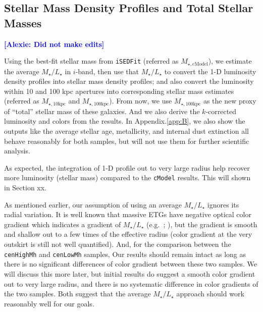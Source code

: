 \documentclass{emulateapj}
\def\cmodel{\texttt{cModel}}
\def\rbcg{\texttt{cenHighMh}}
\def\nbcg{\texttt{cenLowMh}}
\def\minn{{$M_{\star,10\mathrm{kpc}}$}}
\def\mtot{{$M_{\star,100\mathrm{kpc}}$}}
\def\mcmodel{{$M_{\star,\mathrm{cModel}}$}}
\def\m2l{{$M_{\star}/L_{\star}$}}
\newcommand{\alexie}[1]{\textcolor{blue}{\textbf{[Alexie: #1]}}}
\begin{document}
\begin{CJK*}{UTF8}{gbsn}
\subsection{Stellar Mass Density Profiles and Total Stellar Masses}
    \label{ssec:mtotal}
    
    \alexie{Did not make edits}
    
    Using the best-fit stellar mass from \texttt{iSEDFit} (referred as \mcmodel{}), 
    we estimate the average \m2l{} in $i$-band, then use that \m2l{} to convert the 
    1-D luminosity density profiles into stellar mass density profiles; and 
    also convert the luminosity within 10 and 100 kpc apertures into 
    corresponding stellar mass estimates (referred as \minn{} and \mtot{}). 
    From now, we use \mtot{} as the new proxy of ``total'' stellar mass of these 
    galaxies.  
    And we also derive the $k$-corrected luminosity and colors from the results.
    In Appendix.\ref{app:B}, we also show the outputs like the average stellar age, 
    metallicity, and internal dust extinction all behave reasonably for both 
    samples, but will not use them for further scientific analysis. 
    
    As expected, the integration of 1-D profile out to very large radius help 
    recover more luminosity (stellar mass) compared to the \cmodel{} results. This will shown in Section xx.
 
        
    As mentioned earlier, our assumption of using an average \m2l{} ignores its
    radial variation.   
    It is well known that massive ETGs have negative optical color gradient which 
    indicates a gradient of \m2l{} (e.g.\ \citealt{LaBarbera2012}; \citealt{DSouza2015}),
    but the gradient is smooth and shallow out to a few times of the effective 
    radius (color gradient at the very outskirt is still not well quantified). 
    And, for the comparison between the \rbcg{} and \nbcg{} samples, 
    Our results should remain intact as long as there is no significant
    differences of color gradient between these two samples.
    We will discuss this more later, but initial results do suggest a smooth color
    gradient out to very large radius, and there is no systematic difference in 
    color gradients of the two samples.  
    Both suggest that the average \m2l{} approach should work reasonably well for
    our goals.
    

\end{CJK*}
\end{document}
